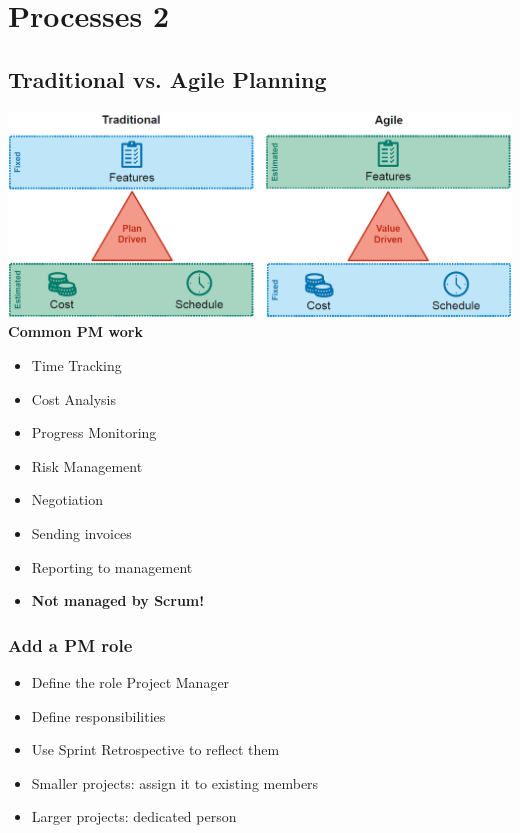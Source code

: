 
\section{Processes 2}
\subsection{Traditional vs. Agile Planning}
\includegraphics[width=\linewidth]{../img/traditional_vs_agile_planning.png}
\textbf{Common PM work}
\begin{itemize}
    \item Time Tracking
    \item Cost Analysis
    \item Progress Monitoring
    \item Risk Management
    \item Negotiation
    \item Sending invoices
    \item Reporting to management
    \item \textbf{Not managed by Scrum!}
\end{itemize}
\subsubsection{Add a PM role}
\begin{itemize}
    \item Define the role Project Manager
    \item Define responsibilities
    \item Use Sprint Retrospective to reflect them
    \item Smaller projects: assign it to existing members
    \item Larger projects: dedicated person
\end{itemize}

